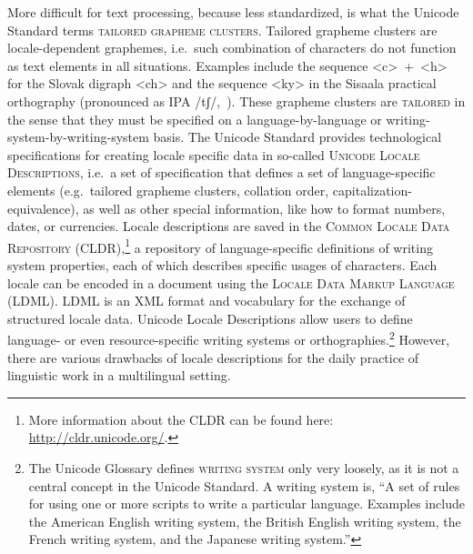More difficult for text processing, because less standardized, is what the
Unicode Standard terms \textsc{tailored grapheme clusters}. Tailored grapheme
clusters are locale-dependent graphemes, i.e.~such combination of characters do
not function as text elements in all situations. Examples include the sequence
<c>~+~<h> for the Slovak digraph <ch> and the sequence <ky> in the Sisaala
practical orthography (pronounced as IPA /tʃ/,~\cite{Moran2006}). These grapheme
clusters are \textsc{tailored} in the sense that they must be specified on a
language-by-language or writing-system-by-writing-system basis. The Unicode
Standard provides technological specifications for creating locale specific data
in so-called \textsc{Unicode Locale Descriptions}, i.e.~a set of specification
that defines a set of language-specific elements (e.g.~tailored grapheme
clusters, collation order, capitalization-equivalence), as well as other special
information, like how to format numbers, dates, or currencies. Locale
descriptions are saved in the \textsc{Common Locale Data Repository
(CLDR)},\footnote{More information about the CLDR can be found here:
\url{http://cldr.unicode.org/}.} a repository of
language-specific definitions of writing system properties, each of which
describes specific usages of characters. Each locale can be encoded in a
document using the \textsc{Locale Data Markup Language (LDML)}. LDML is an XML
format and vocabulary for the exchange of structured locale data. Unicode Locale
Descriptions allow users to define language- or even resource-specific writing
systems or orthographies.\footnote{The Unicode Glossary defines \textsc{writing
system} only very loosely, as it is not a central concept in the Unicode
Standard. A writing system is, ``A set of rules for using one or more scripts to
write a particular language. Examples include the American English writing
system, the British English writing system, the French writing system, and the
Japanese writing system.''} However, there are various drawbacks of locale
descriptions for the daily practice of linguistic work in a multilingual setting.

